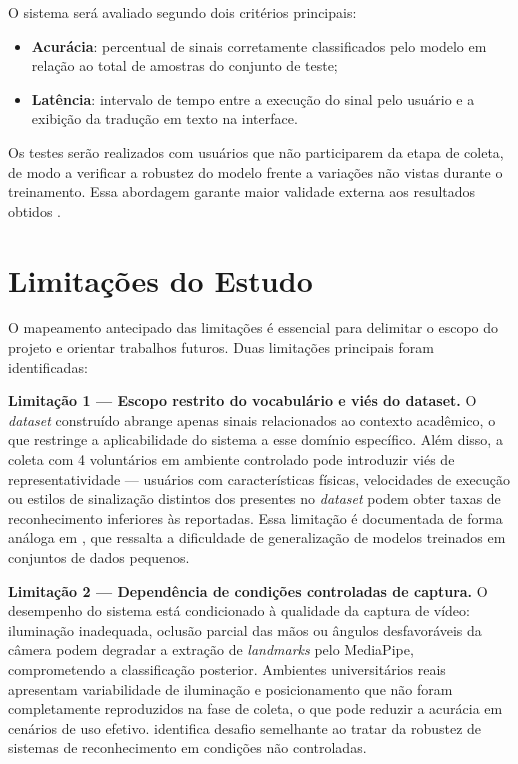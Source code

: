 O sistema será avaliado segundo dois critérios principais:

\begin{itemize}
    \item \textbf{Acurácia}: percentual de sinais corretamente classificados pelo modelo em relação ao total de amostras do conjunto de teste;
    \item \textbf{Latência}: intervalo de tempo entre a execução do sinal pelo usuário e a exibição da tradução em texto na interface.
\end{itemize}

Os testes serão realizados com usuários que não participarem da etapa de coleta, de modo a verificar a robustez do modelo frente a variações não vistas durante o treinamento. Essa abordagem garante maior validade externa aos resultados obtidos \cite{attili:24}.

\section{Limitações do Estudo}

O mapeamento antecipado das limitações é essencial para delimitar o escopo do projeto e orientar trabalhos futuros. Duas limitações principais foram identificadas:

\textbf{Limitação 1 — Escopo restrito do vocabulário e viés do dataset.}
O \textit{dataset} construído abrange apenas sinais relacionados ao contexto acadêmico, o que restringe a aplicabilidade do sistema a esse domínio específico. Além disso, a coleta com 4 voluntários em ambiente controlado pode introduzir viés de representatividade — usuários com características físicas, velocidades de execução ou estilos de sinalização distintos dos presentes no \textit{dataset} podem obter taxas de reconhecimento inferiores às reportadas. Essa limitação é documentada de forma análoga em \cite{abdulhussein:20}, que ressalta a dificuldade de generalização de modelos treinados em conjuntos de dados pequenos.

\textbf{Limitação 2 — Dependência de condições controladas de captura.}
O desempenho do sistema está condicionado à qualidade da captura de vídeo: iluminação inadequada, oclusão parcial das mãos ou ângulos desfavoráveis da câmera podem degradar a extração de \textit{landmarks} pelo MediaPipe, comprometendo a classificação posterior. Ambientes universitários reais apresentam variabilidade de iluminação e posicionamento que não foram completamente reproduzidos na fase de coleta, o que pode reduzir a acurácia em cenários de uso efetivo. \cite{jain:24} identifica desafio semelhante ao tratar da robustez de sistemas de reconhecimento em condições não controladas.